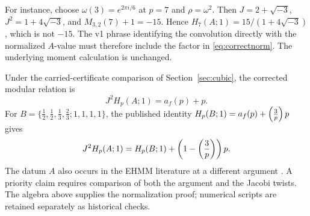 For instance, choose $\omega(3)=e^{2\pi i/6}$ at $p=7$ and
$\rho=\omega^2$. Then $J=2+\sqrt{-3}$, $J^2=1+4\sqrt{-3}$,
and $M_{3,2}(7)+1=-15$. Hence
$H_7(A;1)=15/(1+4\sqrt{-3})$, which is not $-15$.
The v1 phrase identifying the convolution directly with the normalized
$A$-value must therefore include the factor in \eqref{eq:correctnorm}.
The underlying moment calculation is unchanged.

Under the carried-certificate comparison of Section~\ref{sec:cubic}, the corrected modular relation is
\[
 J^2 H_p(A;1)=a_f(p)+p.
\]
For $B=\{\frac12,\frac12,\frac13,\frac23;1,1,1,1\}$, the
published identity $H_p(B;1)=a_f(p)+\left(\frac{3}{p}\right)p$
\cite[Theorem~2 and Table~1]{LTYZ} gives
\[
 J^2 H_p(A;1)=H_p(B;1)+\left(1-\left(\frac{3}{p}\right)\right)p.
\]
The datum $A$ also occurs in the EHMM literature at a different
argument \cite{EHMM2}. A priority claim requires comparison of both
the argument and the Jacobi twists. The algebra above supplies the normalization proof; numerical scripts are retained separately as historical checks.

